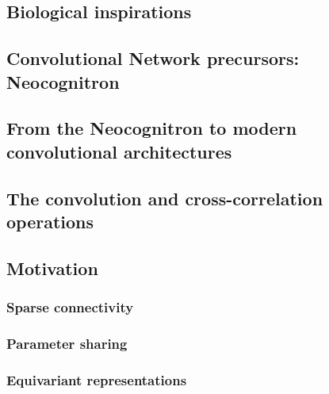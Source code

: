 \subsection{Biological inspirations}


\subsection{Convolutional Network precursors: Neocognitron}


\subsection{From the Neocognitron to modern convolutional architectures}


\subsection{The convolution and cross-correlation operations}


\subsection{Motivation}

\subsubsection{Sparse connectivity}

\subsubsection{Parameter sharing}

\subsubsection{Equivariant representations}


